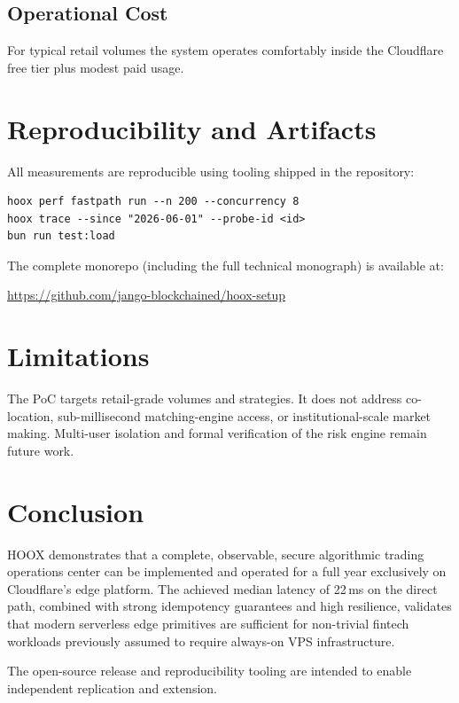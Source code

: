 \documentclass[10pt,a4paper]{article}
\newcommand{\textsc}[1]{\textsf{\small #1}}
\begin{document}
\subsection{Operational Cost}

For typical retail volumes the system operates comfortably inside the Cloudflare free tier plus modest paid usage.

\section{Reproducibility and Artifacts}

All measurements are reproducible using tooling shipped in the repository:

\begin{verbatim}
hoox perf fastpath run --n 200 --concurrency 8
hoox trace --since "2026-06-01" --probe-id <id>
bun run test:load
\end{verbatim}

The complete monorepo (including the full technical monograph) is available at:

\url{https://github.com/jango-blockchained/hoox-setup}

\section{Limitations}

The PoC targets retail-grade volumes and strategies. It does not address co-location, sub-millisecond matching-engine access, or institutional-scale market making. Multi-user isolation and formal verification of the risk engine remain future work.

\section{Conclusion}

\textsc{HOOX} demonstrates that a complete, observable, secure algorithmic trading operations center can be implemented and operated for a full year exclusively on Cloudflare's edge platform. The achieved median latency of 22\,ms on the direct path, combined with strong idempotency guarantees and high resilience, validates that modern serverless edge primitives are sufficient for non-trivial fintech workloads previously assumed to require always-on VPS infrastructure.

The open-source release and reproducibility tooling are intended to enable independent replication and extension.
\end{document}
